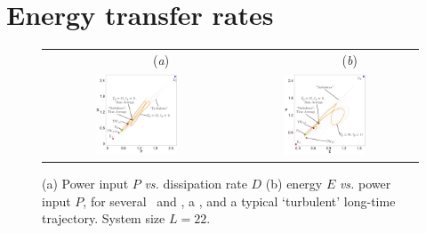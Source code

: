 \section{Energy transfer rates}
\label{sec:energyL22}


\begin{figure}[h!t]
\begin{center}
 \begin{tabular}{cc}
        ~~~~~~~~(\textit{a})                        &   ~~~~~~~~(\textit{b}) \\
    \includegraphics[width=0.46\textwidth]{../figs/energyBalance_pst}
  & \includegraphics[width=0.46\textwidth]{../figs/equivaEP_pst}

  \end{tabular}
\end{center}
\caption[Power input {\em vs.} dissipation rate]{
(a) Power input $P$ {\em vs.}
dissipation rate $D$
(b) energy $E$  {\em vs.}
power input $P$,   for several  \eqva\ and \reqva,
a \rpo , and a typical `turbulent' long-time trajectory.
System size $L=22$.
        }
\label{f:drivedrag}
\end{figure}

